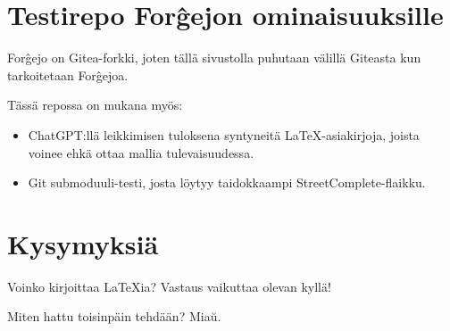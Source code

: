 \documentclass[a4paper]{artikel3}
\begin{document}
\section*{Testirepo For\^gejon ominaisuuksille}

For\^gejo on Gitea-forkki, joten tällä sivustolla puhutaan välillä Giteasta kun tarkoitetaan For\^gejoa.

Tässä repossa on mukana myös:


\begin{itemize}
    \item ChatGPT:llä leikkimisen tuloksena syntyneitä \LaTeX -asiakirjoja, joista voinee ehkä ottaa mallia tulevaisuudessa.
    \item Git submoduuli-testi, josta löytyy taidokkaampi StreetComplete-flaikku.
\end{itemize}

\section*{Kysymyksiä}
Voinko kirjoittaa \LaTeX ia?
Vastaus vaikuttaa olevan kyllä!

Miten hattu toisinpäin tehdään?
Mia\u{u}.
\end{document}
